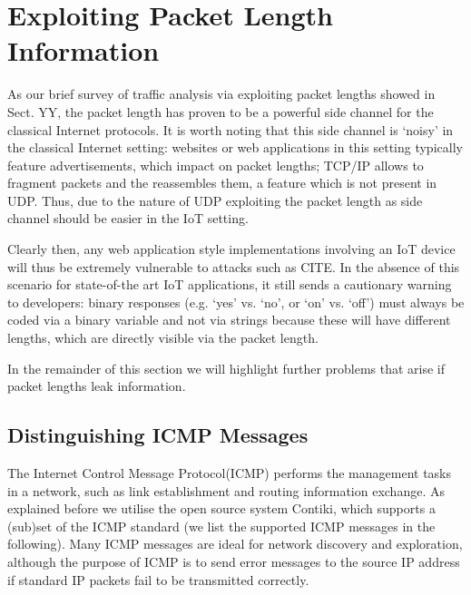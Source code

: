 \documentclass{article}
\begin{document}


\section{Exploiting Packet Length Information}

As our brief survey of traffic analysis via exploiting packet lengths showed in Sect. YY, the packet length has proven to be a powerful side channel for the classical Internet protocols. It is worth noting that this side channel is `noisy' in the classical Internet setting: websites or web applications in this setting typically feature advertisements, which impact on packet lengths; TCP/IP allows to fragment packets and the reassembles them, a feature which is not present in UDP. Thus, due to the nature of UDP exploiting the packet length as side channel should be easier in the IoT setting.

Clearly then, any web application style implementations involving an IoT device will thus be extremely vulnerable to attacks such as CITE. In the absence of this scenario for state-of-the art IoT applications, it still sends a cautionary warning to developers: binary responses (e.g. `yes' vs. `no', or `on' vs. `off') must always be coded via a binary variable and not via strings because these will have different lengths, which are directly visible via the packet length.

In the remainder of this section we will highlight further problems that arise if packet lengths leak information.

\subsection{Distinguishing ICMP Messages}
The Internet Control Message Protocol(ICMP)\cite{rfc4443} performs the management tasks in a network, such as link establishment and routing information exchange. As explained before we utilise the open source system Contiki, which supports a (sub)set of the ICMP standard (we list the supported ICMP messages in the following). Many ICMP messages are ideal for network discovery and exploration, although the purpose of ICMP is to send error messages to the source IP address if standard IP packets fail to be transmitted correctly. 
\end{document}
